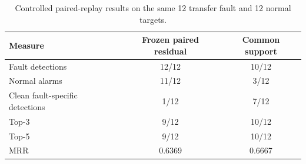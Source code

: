 \begin{table}[H]
\caption{Controlled paired-replay results on the same 12 transfer fault and 12 normal targets.}
\label{tab:controlled_replay_summary}
\centering
\footnotesize
\renewcommand{\arraystretch}{1.12}
\begin{tabularx}{\textwidth}{@{}>{\RaggedRight\arraybackslash}X cc@{}}
\toprule
\textbf{Measure} & \textbf{Frozen paired residual} & \textbf{Common support}\\
\midrule
Fault detections & 12/12 & 10/12\\
Normal alarms & 11/12 & 3/12\\
Clean fault-specific detections & 1/12 & 7/12\\
Top-3 & 9/12 & 10/12\\
Top-5 & 9/12 & 10/12\\
MRR & 0.6369 & 0.6667\\
\bottomrule
\end{tabularx}
\par\vspace{2pt}{\scriptsize The common-support evaluation was conducted after transfer-data exposure. Ranking denominators retain all 12 fault targets.}
\end{table}
